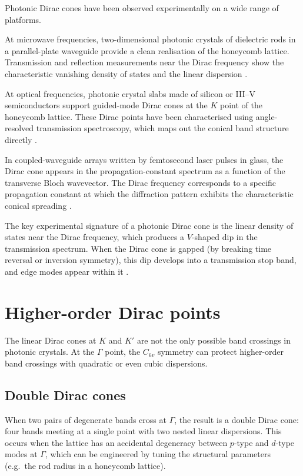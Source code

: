 Photonic Dirac cones have been observed experimentally on a wide
range of platforms.

At microwave frequencies, two-dimensional photonic crystals of
dielectric rods in a parallel-plate waveguide provide a clean
realisation of the honeycomb lattice.  Transmission and reflection
measurements near the Dirac frequency show the characteristic
vanishing density of states and the linear dispersion
\cite{ozawa2018topological,haldane2008possible,raghu2008analogs}.

At optical frequencies, photonic crystal slabs made of silicon or
III--V semiconductors support guided-mode Dirac cones at the $K$
point of the honeycomb lattice.  These Dirac points have been
characterised using angle-resolved transmission spectroscopy,
which maps out the conical band structure directly
\cite{price2022roadmap}.

In coupled-waveguide arrays written by femtosecond laser pulses in
glass, the Dirac cone appears in the propagation-constant spectrum
as a function of the transverse Bloch wavevector.  The Dirac
frequency corresponds to a specific propagation constant at which
the diffraction pattern exhibits the characteristic conical spreading
\cite{rechtsman2013photonica}.

The key experimental signature of a photonic Dirac cone is the
linear density of states near the Dirac frequency, which produces
a $V$-shaped dip in the transmission spectrum.  When the Dirac cone
is gapped (by breaking time reversal or inversion symmetry), this
dip develops into a transmission stop band, and edge modes appear
within it \cite{ozawa2018topological}.

\section{Higher-order Dirac points}
\label{sec:ch6-higher-order}

The linear Dirac cones at $K$ and $K'$ are not the only possible
band crossings in photonic crystals.  At the $\Gamma$ point, the
$C_{6v}$ symmetry can protect higher-order band crossings with
quadratic or even cubic dispersions.

\subsection{Double Dirac cones}
\label{sec:ch6-double-dirac}

When two pairs of degenerate bands cross at $\Gamma$, the result is a
double Dirac cone: four bands meeting at a single point with two
nested linear dispersions.  This occurs when the lattice has an
accidental degeneracy between $p$-type and $d$-type modes at
$\Gamma$, which can be engineered by tuning the structural parameters
(e.g.\ the rod radius in a honeycomb lattice).

